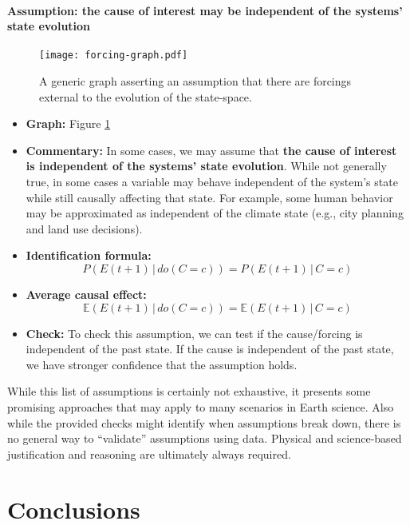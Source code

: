 \documentclass[12pt]{article}
\begin{document}
\newpage

\paragraph{Assumption: the cause of interest may be independent of the
  systems' state evolution}

\begin{figure} \texttt{[image: forcing-graph.pdf]}
  \caption{A generic graph asserting an assumption that there are
    forcings external to the evolution of the state-space.}
  \label{fig:forcing}
\end{figure}

\begin{itemize}
\item \textbf{Graph:} Figure \ref{fig:forcing}
\item \textbf{Commentary:} In some cases, we may assume that
  \textbf{the cause of interest is independent of the systems' state
    evolution}. While not generally true, in some cases a variable may
  behave independent of the system's state while still causally
  affecting that state. For example, some human behavior may be
  approximated as independent of the climate state (e.g., city
  planning and land use decisions).
\item \textbf{Identification formula:}
  \begin{equation*}
    P(E(t+1) \, | \, do(C = c)) = P(E(t+1) \, | \, C = c)
  \end{equation*}
\item \textbf{Average causal effect:}
  \begin{equation*}
    \mathbb{E}(E(t+1) \, | \, do(C = c)) = \mathbb{E}(E(t+1) \, | \, C=c)
  \end{equation*}
\item \textbf{Check:} To check this assumption, we can test if the
  cause/forcing is independent of the past state. If the cause is
  independent of the past state, we have stronger confidence that the
  assumption holds.
\end{itemize}

While this list of assumptions is certainly not exhaustive, it
presents some promising approaches that may apply to many scenarios in
Earth science. Also while the provided checks might identify when
assumptions break down, there is no general way to ``validate''
assumptions using data. Physical and science-based justification and
reasoning are ultimately always required.

\section{Conclusions}
\end{document}
